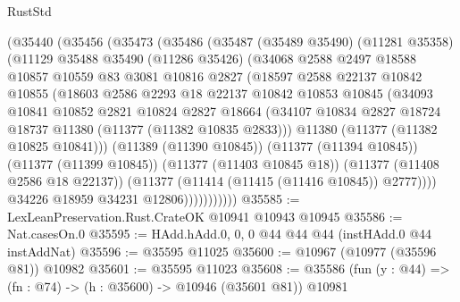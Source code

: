 \begin{lexlean}{RustStd}
\begin{coremodule}
            (@35440
              (@35456
                (@35473
                  (@35486
                    (@35487
                      (@35489 @35490)
                      (@11281 @35358)
                      (@11129
                        @35488
                        @35490
                        (@11286 @35426)
                        (@34068
                          @2588
                          @2497
                          @18588
                          @10857
                          @10559
                          @83
                          @3081
                          @10816
                          @2827
                          (@18597
                            @2588
                            @22137
                            @10842
                            @10855
                            (@18603
                              @2586
                              @2293
                              @18
                              @22137
                              @10842
                              @10853
                              @10845
                              (@34093
                                @10841
                                @10852
                                @2821
                                @10824
                                @2827
                                @18664
                                (@34107
                                  @10834
                                  @2827
                                  @18724
                                  @18737
                                  @11380
                                  (@11377 (@11382 @10835 @2833)))
                                @11380
                                (@11377 (@11382 @10825 @10841)))
                              (@11389 (@11390 @10845))
                              (@11377 (@11394 @10845))
                              (@11377 (@11399 @10845))
                              (@11377 (@11403 @10845 @18))
                              (@11377 (@11408 @2586 @18 @22137))
                              (@11377 (@11414 (@11415 (@11416 @10845)) @2777))))
                          @34226
                          @18959
                          @34231
                          @12806)))))))))))
@35585 := LexLeanPreservation.Rust.CrateOK @10941 @10943 @10945
@35586 := Nat.casesOn.{0}
@35595 := HAdd.hAdd.{0, 0, 0} @44 @44 @44 (instHAdd.{0} @44 instAddNat)
@35596 := @35595 @11025
@35600 := @10967 (@10977 (@35596 @81)) @10982
@35601 := @35595 @11023
@35608 := @35586 (fun (y : @44) => (fn : @74) -> (h : @35600) -> @10946 (@35601 @81)) @10981

\end{coremodule}
\end{lexlean}
